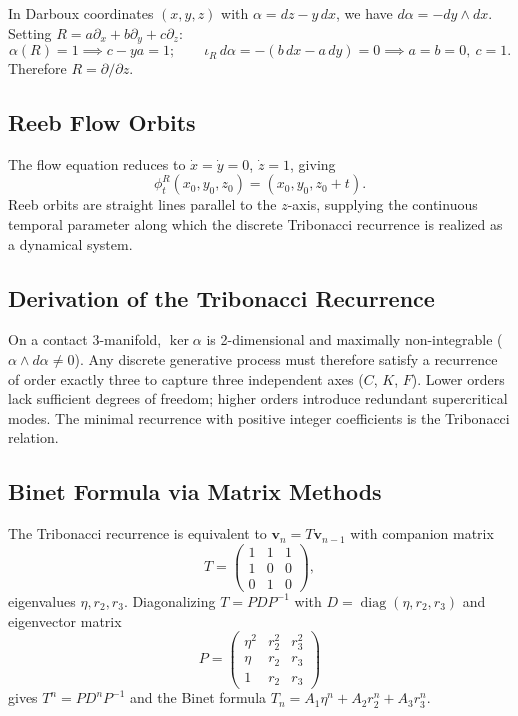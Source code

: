 \documentclass[11pt,a4paper]{article}
\theoremstyle{definition}
\theoremstyle{remark}
\begin{document}
In Darboux coordinates $(x,y,z)$ with $\alpha=dz-y\,dx$, we have $d\alpha=-dy\wedge dx$. Setting
$R=a\partial_x+b\partial_y+c\partial_z$:
\[
  \alpha(R)=1\implies c-ya=1;\qquad \iota_R\,d\alpha=-(b\,dx-a\,dy)=0\implies a=b=0,\ c=1.
\]
Therefore $R=\partial/\partial z$.

\subsection{Reeb Flow Orbits}

The flow equation reduces to $\dot{x}=\dot{y}=0$, $\dot{z}=1$, giving
\[
  \phi_t^R(x_0,y_0,z_0)=(x_0,y_0,z_0+t).
\]
Reeb orbits are straight lines parallel to the $z$-axis, supplying the continuous temporal
parameter along which the discrete Tribonacci recurrence is realized as a dynamical system.

\subsection{Derivation of the Tribonacci Recurrence}

On a contact 3-manifold, $\ker\alpha$ is 2-dimensional and maximally non-integrable
($\alpha\wedge d\alpha\ne0$). Any discrete generative process must therefore satisfy a
recurrence of order exactly three to capture three independent axes ($C$, $K$, $F$). Lower
orders lack sufficient degrees of freedom; higher orders introduce redundant supercritical modes.
The minimal recurrence with positive integer coefficients is the Tribonacci relation.

\subsection{Binet Formula via Matrix Methods}

The Tribonacci recurrence is equivalent to $\mathbf{v}_n=T\mathbf{v}_{n-1}$ with companion matrix
\[
  T=\begin{pmatrix}1&1&1\\1&0&0\\0&1&0\end{pmatrix},
\]
eigenvalues $\eta,r_2,r_3$. Diagonalizing $T=PDP^{-1}$ with $D=\operatorname{diag}(\eta,r_2,r_3)$
and eigenvector matrix
\[
  P=\begin{pmatrix}\eta^2&r_2^2&r_3^2\\\eta&r_2&r_3\\1&r_2&r_3\end{pmatrix}
\]
gives $T^n=PD^nP^{-1}$ and the Binet formula $T_n=A_1\eta^n+A_2r_2^n+A_3r_3^n$.
\end{document}
